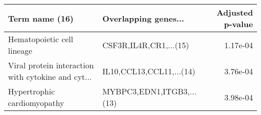 \begin{tabular}{llr}
\toprule
                                    Term name (16) &      Overlapping genes... &  Adjusted p-value \\
\midrule
                        Hematopoietic cell lineage &    CSF3R,IL4R,CR1,...(15) &          1.17e-04 \\
Viral protein interaction with cytokine and cyt... &  IL10,CCL13,CCL11,...(14) &          3.76e-04 \\
                       Hypertrophic cardiomyopathy & MYBPC3,EDN1,ITGB3,...(13) &          3.98e-04 \\
\bottomrule
\end{tabular}
